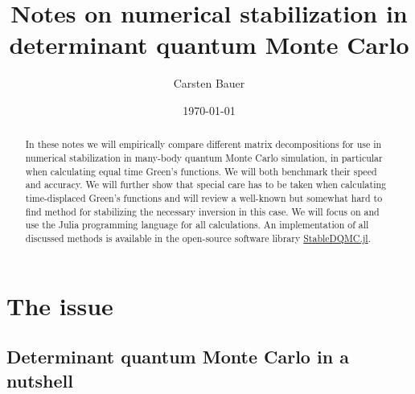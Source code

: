 \documentclass[%
 reprint,
superscriptaddress,
showpacs,
 amsmath,amssymb,
 aps,
 prb,
longbibliography,
]{revtex4-1}
\begin{document}
\title{Notes on numerical stabilization in determinant quantum Monte Carlo}%

\author{Carsten Bauer}

\date{\today}%

\begin{abstract}
In these notes we will empirically compare different matrix decompositions for use in numerical stabilization in many-body quantum Monte Carlo simulation, in particular when calculating equal time Green's functions. We will both benchmark their speed and accuracy. We will further show that special care has to be taken when calculating time-displaced Green's functions and will review a well-known but somewhat hard to find method for stabilizing the necessary inversion in this case. We will focus on and use the Julia programming language for all calculations. An implementation of all discussed methods is available in the open-source software library \href{http://github.com/crstnbr/StableDQMC.jl}{StableDQMC.jl}.
\end{abstract}


\maketitle


\section{\label{sec:why}The issue}

\subsection{Determinant quantum Monte Carlo in a nutshell}
\end{document}
